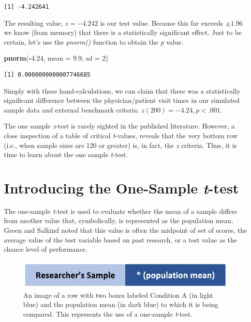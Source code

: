 \documentclass[
  11pt,
]{book}
\newenvironment{Shaded}{\begin{snugshade}}{\end{snugshade}}
\newcommand{\AttributeTok}[1]{\textcolor[rgb]{0.27,0.27,0.27}{#1}}
\newcommand{\DecValTok}[1]{\textcolor[rgb]{0.06,0.06,0.06}{#1}}
\newcommand{\FloatTok}[1]{\textcolor[rgb]{0.06,0.06,0.06}{#1}}
\newcommand{\FunctionTok}[1]{\textcolor[rgb]{0.27,0.27,0.27}{\textbf{#1}}}
\newcommand{\NormalTok}[1]{#1}
\newcommand{\SpecialCharTok}[1]{\textcolor[rgb]{0.43,0.43,0.43}{\textbf{#1}}}
\begin{document}
\begin{verbatim}
[1] -4.242641
\end{verbatim}

The resulting value, \(z = -4.242\) is our test value. Because this far exceeds \(\pm 1.96\) we know (from memory) that there is a statistically significant effect. Just to be certain, let's use the \emph{pnorm()} function to obtain the \emph{p} value.

\begin{Shaded}
\begin{Highlighting}[]
\FunctionTok{pnorm}\NormalTok{(}\SpecialCharTok{{-}}\FloatTok{4.24}\NormalTok{, }\AttributeTok{mean =} \FloatTok{9.9}\NormalTok{, }\AttributeTok{sd =} \DecValTok{2}\NormalTok{)}
\end{Highlighting}
\end{Shaded}

\begin{verbatim}
[1] 0.0000000000007746685
\end{verbatim}

Simply with these hand-calculations, we can claim that there was a statistically significant difference between the physician/patient visit times in our simulated sample data and external benchmark criteria: \(z(200) = -4.24, p < .001\).

The one sample \emph{z}-test is rarely sighted in the published literature. However, a close inspection of a table of critical \emph{t}-values, reveals that the very bottom row (i.e., when sample sizes are 120 or greater) is, in fact, the \emph{z} criteria. Thus, it is time to learn about the one sample \emph{t}-test.

\hypertarget{introducing-the-one-sample-t-test}{%
\section{\texorpdfstring{Introducing the One-Sample \emph{t}-test}{Introducing the One-Sample t-test}}\label{introducing-the-one-sample-t-test}}

The one-sample \emph{t}-test is used to evaluate whether the mean of a sample differs from another value that, symbolically, is represented as the population mean. Green and Salkind \citeyearpar{green_using_2017} noted that this value is often the midpoint of set of scores, the average value of the test variable based on past research, or a test value as the chance level of performance.

\begin{figure}
\centering
\includegraphics{images/ttests/onesample.jpg}
\caption{An image of a row with two boxes labeled Condition A (in light blue) and the population mean (in dark blue) to which it is being compared. This represents the use of a one-sample \emph{t}-test.}
\end{figure}
\end{document}

